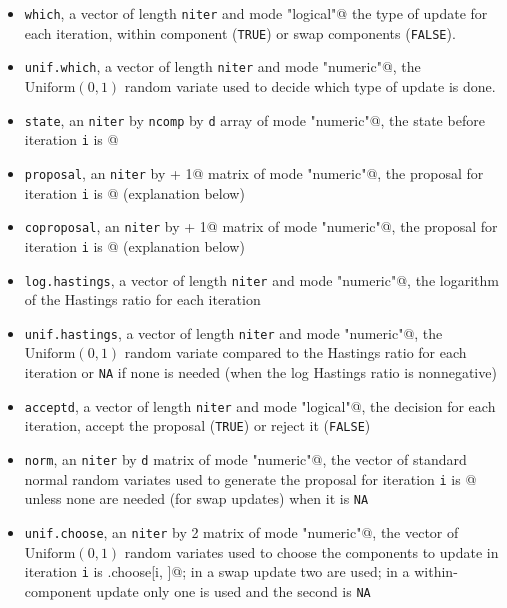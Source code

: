 \documentclass{article}
\begin{document}
\begin{itemize}
\item \texttt{which}, a vector of length \texttt{niter}
    and mode \verb@"logical"@ the type of update for each iteration,
    within component (\texttt{TRUE}) or swap components (\texttt{FALSE}).
\item \texttt{unif.which}, a vector of length \texttt{niter}
    and mode \verb@"numeric"@, the $\text{Uniform}(0, 1)$ random variate
    used to decide which type of update is done.
\item \texttt{state}, an \texttt{niter} by \texttt{ncomp} by \texttt{d}
    array of mode \verb@"numeric"@, the state before iteration \texttt{i}
    is \verb@state[i, , ]@
\item \texttt{proposal}, an \texttt{niter} by \verb@d + 1@
    matrix of mode \verb@"numeric"@, the proposal for iteration \texttt{i}
    is \verb@proposal[i, ]@ (explanation below)
\item \texttt{coproposal}, an \texttt{niter} by \verb@d + 1@
    matrix of mode \verb@"numeric"@, the proposal for iteration \texttt{i}
    is \verb@coproposal[i, ]@ (explanation below)
\item \texttt{log.hastings}, a vector of length \texttt{niter}
    and mode \verb@"numeric"@, the logarithm of the Hastings ratio for
    each iteration
\item \texttt{unif.hastings}, a vector of length \texttt{niter}
    and mode \verb@"numeric"@, the $\text{Uniform}(0, 1)$ random variate
    compared to the Hastings ratio for each iteration or \texttt{NA} if
    none is needed (when the log Hastings ratio is nonnegative)
\item \texttt{acceptd}, a vector of length \texttt{niter}
    and mode \verb@"logical"@, the decision for each iteration,
    accept the proposal (\texttt{TRUE}) or reject it (\texttt{FALSE})
\item \texttt{norm}, an \texttt{niter} by \texttt{d} matrix
    of mode \verb@"numeric"@, the vector of standard normal random variates
    used to generate the proposal for iteration \texttt{i} is \verb@z[i, ]@
    unless none are needed (for swap updates) when it is \texttt{NA} 
\item \texttt{unif.choose}, an \texttt{niter} by 2 matrix
    of mode \verb@"numeric"@, the vector of $\text{Uniform}(0, 1)$
    random variates used to choose the components to update in iteration
    \texttt{i} is \verb@unif.choose[i, ]@; in a swap update two are used;
    in a within-component update only one is used and the second is \texttt{NA}
\end{itemize}
\end{document}
